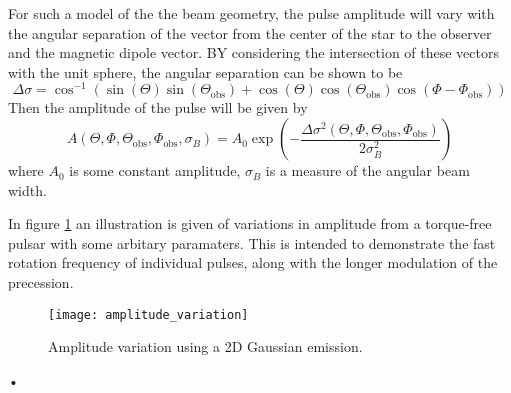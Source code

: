 \documentclass[/home/greg/Thesis/main/main.tex]{subfiles}
\begin{document}
For such a model of the the beam geometry, the pulse amplitude will vary with the 
angular separation of the vector from the center of the star to the observer and the
magnetic dipole vector. BY considering the intersection of these vectors with
the unit sphere, the angular separation can be shown to be
\newcommand{\ThetaO}{\Theta_{\mathrm{obs}}}
\newcommand{\PhiO}{\Phi_{\mathrm{obs}}}
\newcommand{\sigmaB}{\sigma_{B}}
\begin{equation}
\Delta\sigma = \cos^{-1}\left(\sin(\Theta)\sin(\ThetaO) +
                             \cos(\Theta)\cos(\ThetaO)\cos(\Phi - \PhiO)\right) 
\label{eqn: angular sep}
\end{equation}
Then the amplitude of the pulse will be given by 
\begin{equation}
A(\Theta, \Phi, \ThetaO, \PhiO, \sigmaB) = 
A_{0} \exp\left(-\frac{\Delta\sigma^{2}(\Theta, \Phi, \ThetaO, \PhiO)}{2\sigmaB^{2}}\right)
\label{eqn: beam amplitude}
\end{equation}
where $A_{0}$ is some constant amplitude, $\sigmaB$ is a measure of the 
angular beam width.

In figure \ref{fig: amplitude variation} an illustration is given of variations 
in amplitude from a torque-free pulsar with some arbitary paramaters. This is
intended to demonstrate the fast rotation frequency of individual pulses, along
with the longer modulation of the precession.
\begin{figure}[htb]
\centering
\texttt{[image: amplitude\_variation]}
\caption{Amplitude variation using a 2D Gaussian emission.}
\label{fig: amplitude variation}
\end{figure}•

\end{document}

